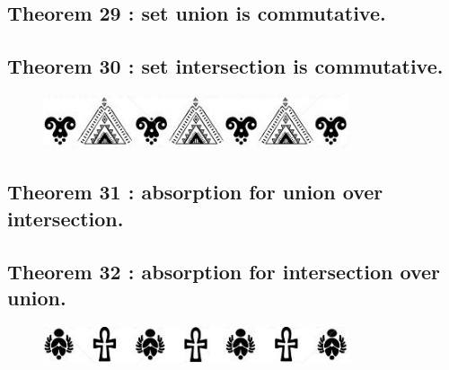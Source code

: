 \documentclass[preview]{standalone}
\begin{document}
\subsection[Set union is commutative.]
    {
        \color{section}Theorem 29 \color{black} : set union is commutative.
    }

\pagebreak


\subsection[Set intersection is commutative.]
    {
        \color{section}Theorem 30 \color{black} : set intersection is commutative.
    }

\vspace{.9\baselineskip}
\begin{figure}[!h]
    \centering
    \includegraphics[width=9cm]{../resources/jpg/2.2.set.operations/border3.jpg}
\end{figure}
\vspace{.8\baselineskip}

\subsection[Absorption for union over intersection.]
    {
        \color{section}Theorem 31 \color{black} : absorption for union over intersection.
    }

\pagebreak


\subsection[Absorption for intersection over union.]
    {
        \color{section}Theorem 32 \color{black} : absorption for intersection over union.
    }

\vspace{1.1\baselineskip}
\begin{figure}[!h]
    \centering
    \includegraphics[width=9cm]{../resources/jpg/2.2.set.operations/border4.jpg}
\end{figure}
\vspace{.1\baselineskip}
\end{document}
